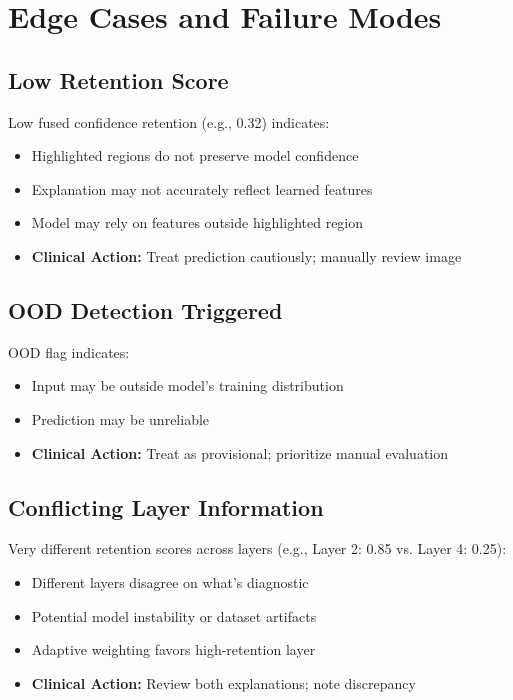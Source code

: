 \documentclass[12pt,a4paper,oneside]{book}
\begin{document}
\section{Edge Cases and Failure Modes}

\subsection{Low Retention Score}

Low fused confidence retention (e.g., 0.32) indicates:
\begin{itemize}
  \item Highlighted regions do not preserve model confidence
  \item Explanation may not accurately reflect learned features
  \item Model may rely on features outside highlighted region
  \item \textbf{Clinical Action:} Treat prediction cautiously; manually review image
\end{itemize}

\subsection{OOD Detection Triggered}

OOD flag indicates:
\begin{itemize}
  \item Input may be outside model's training distribution
  \item Prediction may be unreliable
  \item \textbf{Clinical Action:} Treat as provisional; prioritize manual evaluation
\end{itemize}

\subsection{Conflicting Layer Information}

Very different retention scores across layers (e.g., Layer 2: 0.85 vs. Layer 4: 0.25):
\begin{itemize}
  \item Different layers disagree on what's diagnostic
  \item Potential model instability or dataset artifacts
  \item Adaptive weighting favors high-retention layer
  \item \textbf{Clinical Action:} Review both explanations; note discrepancy
\end{itemize}
\end{document}
